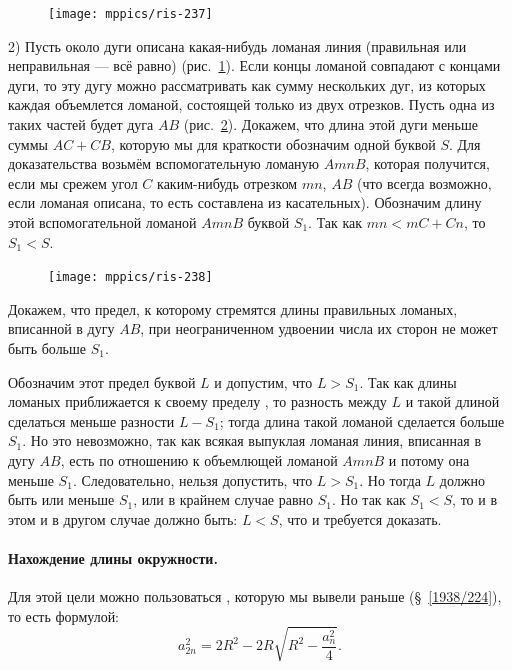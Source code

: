 \documentclass[twoside]{book}
\begin{document}
\begin{figure}
\vskip-4mm
\centering
\texttt{[image: mppics/ris-237]}
\caption{}\label{1938/ris-237}
\end{figure}

2) Пусть около дуги описана какая-нибудь ломаная линия (правильная или неправильная — всё равно) (рис.~\ref{1938/ris-237}).
Если концы ломаной совпадают с концами дуги, то эту дугу можно рассматривать как сумму нескольких дуг, из которых каждая объемлется ломаной, состоящей только из двух отрезков.
Пусть одна из таких частей будет дуга $AB$ (рис.~\ref{1938/ris-238}).
Докажем, что длина этой дуги меньше суммы $AC+CB$, которую мы для краткости обозначим одной буквой $S$.
Для доказательства возьмём вспомогательную ломаную $AmnB$, которая получится, если мы срежем угол $C$ каким-нибудь отрезком $mn$,  $AB$ (что всегда возможно, если ломаная описана, то есть составлена из касательных).
Обозначим длину этой вспомогательной ломаной $AmnB$ буквой $S_1$.
Так как $mn<mC+Cn$, то $S_1<S$.

\begin{figure}
\centering
\texttt{[image: mppics/ris-238]}
\caption{}\label{1938/ris-238}
\end{figure}

Докажем, что предел, к которому стремятся длины правильных ломаных, вписанной в дугу $AB$, при неограниченном удвоении числа их сторон не может быть больше $S_1$.

Обозначим этот предел буквой $L$ и допустим, что $L>S_1$.
Так как длины ломаных приближается к своему пределу , то разность между $L$ и такой длиной сделаться меньше разности $L-S_1$; тогда длина такой ломаной сделается больше $S_1$.
Но это невозможно, так как всякая выпуклая ломаная линия, вписанная в дугу $AB$, есть  по отношению к объемлющей ломаной $AmnB$ и потому она меньше $S_1$.
Следовательно, нельзя допустить, что $L>S_1$.
Но тогда $L$ должно быть или меньше $S_1$, или в крайнем случае равно $S_1$.
Но так как $S_1<S$, то и в этом и в другом случае должно быть:
$L<S$, что и требуется доказать.

\paragraph{Нахождение длины окружности.}\label{1938/237}
Для этой цели можно пользоваться , которую мы вывели раньше (§~\ref{1938/224}), то есть формулой:
\[a_{2n}^2=2R^2-2R\sqrt{R^2-\frac{a_n^2}4}.\]
\end{document}
